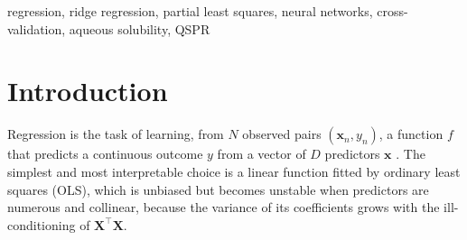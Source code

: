 \documentclass[conference]{IEEEtran}
\begin{document}
\begin{abstract}
This work compares linear and nonlinear regression models for
predicting the aqueous solubility of chemical compounds from molecular
descriptors.
The dataset comprises $1{,}267$ compounds described by $228$ predictors,
208 binary structural fingerprints, 16 counts and 4 continuous
descriptors, split into $951$ training and $316$ test observations.
After a Yeo-Johnson transformation that reduces the median absolute
skewness of the non-binary predictors from $1.36$ to $0.06$, we fit
ordinary least squares (OLS), ridge regression and partial least
squares (PLS), all implemented from scratch together with $10$-fold
cross-validation and checked against scikit-learn, and a single hidden
layer neural network, comparing them through repeated cross-validation
with corrected resampled $t$-tests.
The three linear models are statistically indistinguishable on the test
set, with RMSE between $0.717$ and $0.743$ and $R^2$ between $0.872$ and
$0.881$, whereas the neural network reaches an RMSE of $0.620$ and an
$R^2$ of $0.911$, a difference significant against every linear model,
which indicates that part of the structure--solubility relationship is
nonlinear or interactive.
\end{abstract}

\begin{IEEEkeywords}
regression, ridge regression, partial least squares, neural networks,
cross-validation, aqueous solubility, QSPR
\end{IEEEkeywords}

\section{Introduction}
\label{sec:intro}

Regression is the task of learning, from $N$ observed pairs
$(\mathbf{x}_n, y_n)$, a function $f$ that predicts a continuous outcome
$y$ from a vector of $D$ predictors $\mathbf{x}$
\cite{hastie2009,kuhn2013}. The simplest and most interpretable choice
is a linear function fitted by ordinary least squares (OLS), which is
unbiased but becomes unstable when predictors are numerous and
collinear, because the variance of its coefficients grows with the
ill-conditioning of $\mathbf{X}^\top\mathbf{X}$.
\end{document}
